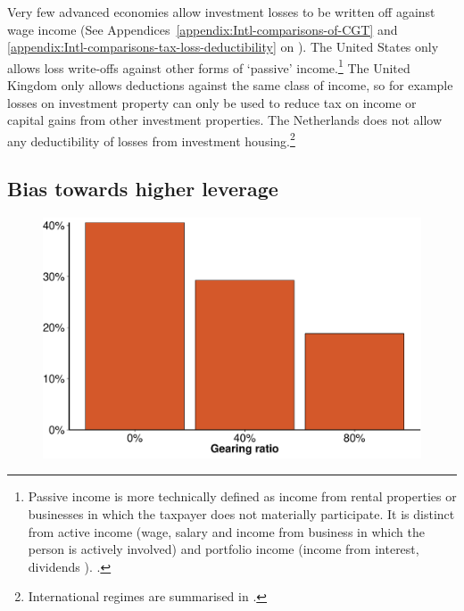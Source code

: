 Very few advanced economies allow investment losses to be written off against wage income (See Appendices~\ref{appendix:Intl-comparisons-of-CGT} and \ref{appendix:Intl-comparisons-tax-loss-deductibility} on ). 
The United States only allows loss write-offs against other forms of ‘passive’ income.\footnote{Passive income\label{footnote:passive-income} is more technically defined as income from rental properties or businesses in which the taxpayer does not materially participate. It is distinct from active income (wage, salary and income from business in which the person is actively involved) and portfolio income (income from interest, dividends \etc). \textcite[See:]{IRS2015}.} 
The United Kingdom only allows deductions against the same class of income, so for example losses on investment property can only be used to reduce tax on income or capital gains from other investment properties. 
The Netherlands does not allow any deductibility of losses from investment housing.\footnote{International regimes are summarised in \textcites[][43]{RBA2014SubmissionAffordableHousingInquiry}[][86]{ProductivityCommission2004FirstHomeOwnership}[][92--95]{ODonnell2005}.}

\subsection{Bias towards higher leverage}
\begin{figure}
\label{fig:EMTR-by-gearing}

\includegraphics[width=\columnwidth]{CGT-NG-atlas//EMTR-by-gearing-1}

\end{figure}


